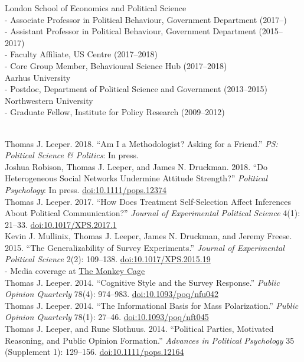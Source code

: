\documentclass[12pt]{article}
\renewcommand{\section}[1]{\pagebreak[3]%
    \llap{\scshape\smash{\parbox[t]{\marginparwidth}{\raggedright {\color{lg}#1}}}}%
    \vspace{-\baselineskip}\par}
\newcommand{\topic}[1]{\pagebreak[3]\indent {\color{lg}{\footnotesize #1 }}\\}
\newcommand{\entry}[1]{\indent {\color{lg}\guillemotright}\hspace{2pt}#1\vspace{.25em}\\}
\newcommand{\subentry}[1]{{\color{lg}-} #1\vspace{.25em}\\}
\begin{document}
\section{Academic Appointments}
\entry{London School of Economics and Political Science}
    \subentry{Associate Professor in Political Behaviour, Government Department (2017--)}
    \subentry{Assistant Professor in Political Behaviour, Government Department (2015--2017)}
    \subentry{Faculty Affiliate, US Centre (2017--2018)}
    \subentry{Core Group Member, Behavioural Science Hub (2017--2018)}
\entry{Aarhus University}
    \subentry{Postdoc, Department of Political Science and Government (2013--2015)}
\entry{Northwestern University}
    \subentry{Graduate Fellow, Institute for Policy Research (2009--2012)}

\section{Publications}
\topic{Peer-Reviewed Publications: Political Science}
    \entry{Thomas J. Leeper. 2018. ``Am I a Methodologist? Asking for a Friend.'' \textit{PS: Political Science \& Politics}: In press.}
	\entry{Joshua Robison, Thomas J. Leeper, and James N. Druckman. 2018. ``Do Heterogeneous Social Networks Undermine Attitude Strength?'' \textit{Political Psychology}: In press. \href{http://doi.org/10.1111/pops.12374}{doi:10.1111/pops.12374}}
    \entry{Thomas J. Leeper. 2017. ``How Does Treatment Self-Selection Affect Inferences About Political Communication?'' \textit{Journal of Experimental Political Science} 4(1): 21--33. \href{http://doi.org/10.1017/XPS.2017.1}{doi:10.1017/XPS.2017.1}}
	\entry{Kevin J. Mullinix, Thomas J. Leeper, James N. Druckman, and Jeremy Freese. 2015. ``The Generalizability of Survey Experiments.'' \textit{Journal of Experimental Political Science} 2(2): 109--138. \href{http://doi.org/10.1017/XPS.2015.19}{doi:10.1017/XPS.2015.19}}
		\subentry{Media coverage at \href{https://www.washingtonpost.com/news/monkey-cage/wp/2016/03/09/does-social-science-have-a-replication-crisis/}{The Monkey Cage}}
	\entry{Thomas J. Leeper. 2014. ``Cognitive Style and the Survey Response.'' \textit{Public Opinion Quarterly} 78(4): 974--983. \href{http://doi.org/10.1093/poq/nfu042}{doi:10.1093/poq/nfu042}}
	\entry{Thomas J. Leeper. 2014. ``The Informational Basis for Mass Polarization.'' \textit{Public Opinion Quarterly} 78(1): 27--46. \href{http://doi.org/10.1093/poq/nft045}{doi:10.1093/poq/nft045}}
	\entry{Thomas J. Leeper, and Rune Slothuus. 2014. ``Political Parties, Motivated Reasoning, and Public Opinion Formation.'' \textit{Advances in Political Psychology} 35 (Supplement 1): 129--156. \href{http://doi.org/10.1111/pops.12164}{doi:10.1111/pops.12164}}
\end{document}
